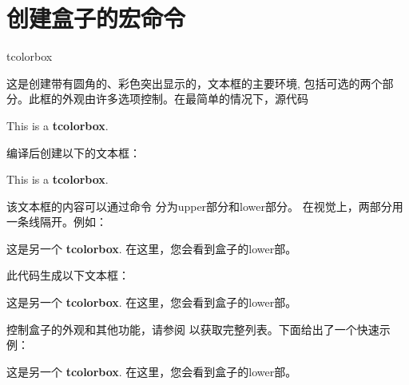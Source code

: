 \section{创建盒子的宏命令}%

%
\begin{docEnvironment}{tcolorbox}{}

这是创建带有圆角的、彩色突出显示的，文本框的主要环境, 包括可选的两个部分。此框的外观由许多选项控制。在最简单的情况下，源代码


\begin{dispListing}
\begin{tcolorbox}
This is a \textbf{tcolorbox}.
\end{tcolorbox}
\end{dispListing}


编译后创建以下的文本框：
\begin{tcolorbox}
This is a \textbf{tcolorbox}.
\end{tcolorbox}



该文本框的内容可以通过命令  分为upper部分和lower部分。 在视觉上，两部分用一条线隔开。例如：
\begin{dispListing}
\begin{tcolorbox}
这是另一个 \textbf{tcolorbox}.
\tcblower
在这里，您会看到盒子的lower部。
\end{tcolorbox}
\end{dispListing}


此代码生成以下文本框：
\begin{tcolorbox}
这是另一个 \textbf{tcolorbox}.
\tcblower
在这里，您会看到盒子的lower部。
\end{tcolorbox}


控制盒子的外观和其他功能，请参阅  以获取完整列表。下面给出了一个快速示例：

\begin{dispExample}
\begin{tcolorbox}[colback=red!5!white,colframe=red!75!black,title=My nice heading]
  这是另一个 \textbf{tcolorbox}.
\tcblower
在这里，您会看到盒子的lower部。
\end{tcolorbox}
\end{dispExample}
\end{docEnvironment}


